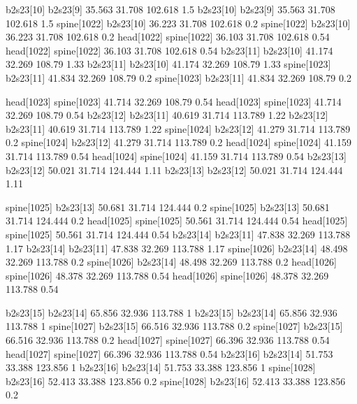 b2s23[10]    b2s23[9]    35.563    31.708    102.618    1.5
b2s23[10]    b2s23[9]    35.563    31.708    102.618    1.5
spine[1022]    b2s23[10]    36.223    31.708    102.618    0.2
spine[1022]    b2s23[10]    36.223    31.708    102.618    0.2
head[1022]    spine[1022]    36.103    31.708    102.618    0.54
head[1022]    spine[1022]    36.103    31.708    102.618    0.54
b2s23[11]    b2s23[10]    41.174    32.269    108.79    1.33
b2s23[11]    b2s23[10]    41.174    32.269    108.79    1.33
spine[1023]    b2s23[11]    41.834    32.269    108.79    0.2
spine[1023]    b2s23[11]    41.834    32.269    108.79    0.2


head[1023]    spine[1023]    41.714    32.269    108.79    0.54
head[1023]    spine[1023]    41.714    32.269    108.79    0.54
b2s23[12]    b2s23[11]    40.619    31.714    113.789    1.22
b2s23[12]    b2s23[11]    40.619    31.714    113.789    1.22
spine[1024]    b2s23[12]    41.279    31.714    113.789    0.2
spine[1024]    b2s23[12]    41.279    31.714    113.789    0.2
head[1024]    spine[1024]    41.159    31.714    113.789    0.54
head[1024]    spine[1024]    41.159    31.714    113.789    0.54
b2s23[13]    b2s23[12]    50.021    31.714    124.444    1.11
b2s23[13]    b2s23[12]    50.021    31.714    124.444    1.11


spine[1025]    b2s23[13]    50.681    31.714    124.444    0.2
spine[1025]    b2s23[13]    50.681    31.714    124.444    0.2
head[1025]    spine[1025]    50.561    31.714    124.444    0.54
head[1025]    spine[1025]    50.561    31.714    124.444    0.54
b2s23[14]    b2s23[11]    47.838    32.269    113.788    1.17
b2s23[14]    b2s23[11]    47.838    32.269    113.788    1.17
spine[1026]    b2s23[14]    48.498    32.269    113.788    0.2
spine[1026]    b2s23[14]    48.498    32.269    113.788    0.2
head[1026]    spine[1026]    48.378    32.269    113.788    0.54
head[1026]    spine[1026]    48.378    32.269    113.788    0.54


b2s23[15]    b2s23[14]    65.856    32.936    113.788    1
b2s23[15]    b2s23[14]    65.856    32.936    113.788    1
spine[1027]    b2s23[15]    66.516    32.936    113.788    0.2
spine[1027]    b2s23[15]    66.516    32.936    113.788    0.2
head[1027]    spine[1027]    66.396    32.936    113.788    0.54
head[1027]    spine[1027]    66.396    32.936    113.788    0.54
b2s23[16]    b2s23[14]    51.753    33.388    123.856    1
b2s23[16]    b2s23[14]    51.753    33.388    123.856    1
spine[1028]    b2s23[16]    52.413    33.388    123.856    0.2
spine[1028]    b2s23[16]    52.413    33.388    123.856    0.2


